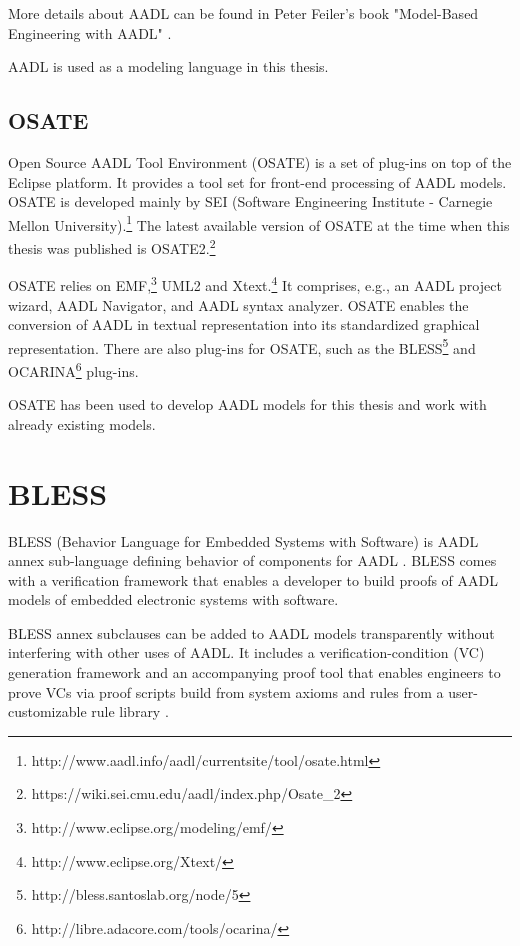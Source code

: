 More details about AADL can be found in Peter Feiler's book "Model-Based Engineering with AADL" \cite{AadlBook}.

AADL is used as a modeling language in this thesis.


\subsection{OSATE}
\label{background:aadl:osate}

Open Source AADL Tool Environment (OSATE) is a set of plug-ins on top of the Eclipse platform. It provides a tool set for front-end processing of AADL models. OSATE is developed mainly by SEI (Software Engineering Institute - Carnegie Mellon University).\footnote{http://www.aadl.info/aadl/currentsite/tool/osate.html} The latest available version of OSATE at the time when this thesis was published is OSATE2.\footnote{https://wiki.sei.cmu.edu/aadl/index.php/Osate\_2} 

OSATE relies on EMF,\footnote{http://www.eclipse.org/modeling/emf/} UML2 and Xtext.\footnote{http://www.eclipse.org/Xtext/} It comprises, e.g., an AADL project wizard, AADL Navigator, and AADL syntax analyzer. OSATE enables the conversion of AADL in textual representation into its standardized graphical representation. There are also plug-ins for OSATE, such as the BLESS\footnote{http://bless.santoslab.org/node/5} and OCARINA\footnote{http://libre.adacore.com/tools/ocarina/} plug-ins.

OSATE has been used to develop AADL models for this thesis and work with already existing models.



\section{BLESS}
\label{background:bless}
BLESS (Behavior Language for Embedded Systems with Software) is AADL annex sub-language defining behavior of components for AADL \cite{Bless:Paper}. BLESS comes with a verification framework that enables a developer to build proofs of AADL models of embedded electronic systems with software.

BLESS annex subclauses can be added to AADL models transparently without interfering with other uses of AADL. It includes a verification-condition (VC) generation framework and an accompanying proof tool that enables engineers to prove VCs via proof scripts build from system axioms and rules from a user-customizable rule library \cite{Bless:Paper}.


